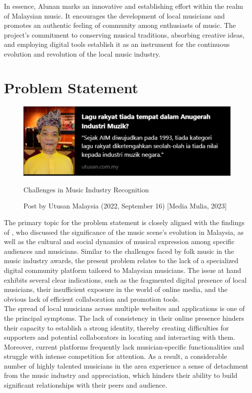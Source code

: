 In essence, Alunan marks an innovative and establishing effort within the realm of Malaysian music. It encourages the development of local musicians and promotes an authentic feeling of community among enthusiasts of music. The project's commitment to conserving musical traditions, absorbing creative ideas, and employing digital tools establish it as an instrument for the continuous evolution and revolution of the local music industry.

\section{Problem Statement}
\begin{figure}[h]
    \centering
    \includegraphics[width=0.6\linewidth]{mainmatter/images/probstate1.png}
    \caption{Challenges in Music Industry Recognition}
    \caption*{Post by Utusan Malaysia (2022, September 16) [Media Mulia, 2023]}
    \label{fig:myfig}
\end{figure}
The primary topic for the problem statement is closely aligned with the findings of \textcite{silahudin19}, who discussed the significance of the music scene's evolution in Malaysia, as well as the cultural and social dynamics of musical expression among specific audiences and musicians. Similar to the challenges faced by folk music in the music industry awards, the present problem relates to the lack of a specialized digital community platform tailored to Malaysian musicians. The issue at hand exhibits several clear indications, such as the fragmented digital presence of local musicians, their insufficient exposure in the world of online media, and the obvious lack of efficient collaboration and promotion tools. \\

The spread of local musicians across multiple websites and applications is one of the principal symptoms. The lack of consistency in their online presence hinders their capacity to establish a strong identity, thereby creating difficulties for supporters and potential collaborators in locating and interacting with them. Moreover, current platforms frequently lack musician-specific functionalities and struggle with intense competition for attention. As a result, a considerable number of highly talented musicians in the area experience a sense of detachment from the music industry and appreciation, which hinders their ability to build significant relationships with their peers and audience. \\

